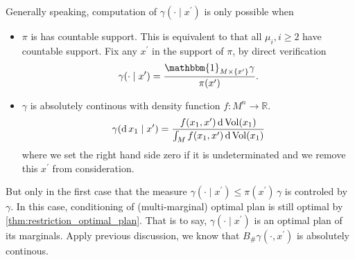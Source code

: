 Generally speaking, computation of $\gamma(\cdot \mid x^\prime)$ is only possible when
\begin{itemize}
	\item $\pi$ is has countable support.
	      This is equivalent to that all $\mu_i, i \geq 2$ have countable support.
	      Fix any $x^\prime$ in the support of $\pi$, by direct verification
	      \[
		      \gamma(\cdot \mid x^\prime) =
		      \frac{
			      \mathbbm{1}_{M \times \{x^\prime\}}
			      \gamma
		      }{\pi(x^\prime)}.
	      \]
	\item $\gamma$ is absolutely continous with density function $f: M^n \rightarrow \mathbb{R} $.
	      \[
		      \gamma(\operatorname{d} x_1 \mid x^\prime) =
		      \frac{
			      f(x_1, x^\prime) \operatorname{d} \operatorname{Vol}(x_1)
		      }
		      {\int_{M} f(x_1, x^\prime) \operatorname{d} \operatorname{Vol}(x_1)
		      }
	      \]
	      where we set the right hand side zero if it is undeterminated
	      and we remove this $x^\prime$ from consideration.
\end{itemize}
But only in the first case that the measure $\gamma(\cdot \mid x^\prime) \leq \pi(x^\prime) \, \gamma$
is controled by $\gamma$.
In this case, conditioning of (multi-marginal) optimal plan is still optimal by \cref{thm:restriction_optimal_plan}.
That is to say, $\gamma(\cdot \mid x^\prime)$ is an optimal plan of its marginals.
Apply previous discussion, we know that $B_{\#}\gamma(\cdot, x^\prime)$
is absolutely continous.

